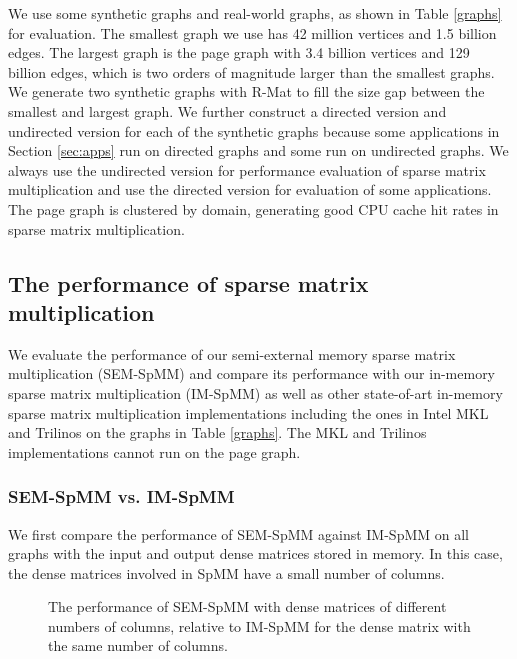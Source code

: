 We use some synthetic graphs and real-world graphs, as shown in Table
\ref{graphs} for evaluation. The smallest graph we use has 42 million vertices
and 1.5 billion
edges. The largest graph is the page graph with 3.4 billion vertices
and 129 billion edges, which is two orders of magnitude larger than the smallest
graphs. We generate two synthetic graphs with R-Mat \cite{rmat} to fill
the size gap between the smallest and largest graph. We further construct
a directed version and undirected version for each of the synthetic graphs
because some applications in Section \ref{sec:apps} run on directed graphs
and some run on undirected graphs. We always use the undirected version for
performance evaluation of sparse matrix multiplication and use the directed
version for evaluation of some applications. The page graph is clustered
by domain, generating good CPU cache hit rates in sparse matrix multiplication.

\subsection{The performance of sparse matrix multiplication}

We evaluate the performance of our semi-external memory sparse matrix
multiplication (SEM-SpMM) and compare its performance with our in-memory sparse
matrix multiplication (IM-SpMM) as well as other state-of-art in-memory sparse
matrix multiplication implementations including the ones in Intel MKL and Trilinos
on the graphs in Table \ref{graphs}. The MKL and Trilinos implementations
cannot run on the page graph.

\subsubsection{SEM-SpMM vs. IM-SpMM}

We first compare the performance of SEM-SpMM against IM-SpMM on all graphs with
the input and output dense matrices stored in memory. In this case, the dense
matrices involved in SpMM have a small number of columns.

\begin{figure}
	\begin{center}
		\footnotesize
		
		\caption{The performance of SEM-SpMM with dense matrices of different
			numbers of columns, relative to IM-SpMM for the dense matrix with
			the same number of columns.}
		\label{perf:spmm_comp}
	\end{center}
\end{figure}

